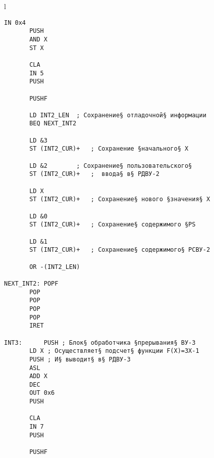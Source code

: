 \newpage
\noindent\begin{center}
	\begin{tabular}{l}
		\begin{lstlisting}[basicstyle=\ttfamily]
	   IN 0x4	
	   PUSH
	   AND X	
	   ST X
		
	   CLA
	   IN 5
	   PUSH
		
	   PUSHF
		
	   LD INT2_LEN	; Сохранение§ отладочной§ информации
	   BEQ NEXT_INT2
		
	   LD &3
	   ST (INT2_CUR)+	; Сохранение §начального§ X
	
	   LD &2		; Сохранение§ пользовательского§
	   ST (INT2_CUR)+	;  ввода§ в§ РДВУ-2
		
	   LD X
	   ST (INT2_CUR)+	; Сохранение§ нового §значения§ X
	
	   LD &0
	   ST (INT2_CUR)+	; Сохранение§ содержимого §PS
		
	   LD &1
	   ST (INT2_CUR)+	; Сохранение§ содержимого§ РСВУ-2

	   OR -(INT2_LEN)	
		
NEXT_INT2: POPF
	   POP
	   POP
	   POP
	   POP
	   IRET
		
INT3:      PUSH ; Блок§ обработчика §прерывания§ ВУ-3
	   LD X	; Осуществляет§ подсчет§ функции F(X)=3X-1
	   PUSH	; И§ выводит§ в§ РДВУ-3
	   ASL
	   ADD X
	   DEC
	   OUT 0x6
	   PUSH

	   CLA
	   IN 7
	   PUSH
		
	   PUSHF
		
			   
\end{lstlisting}
\end{tabular}
\end{center}


